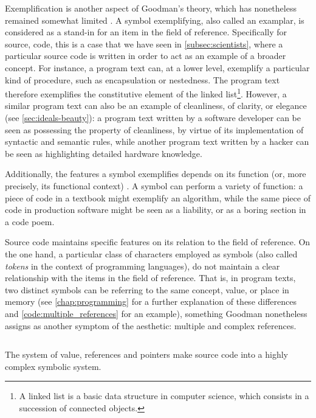 Exemplification is another aspect of Goodman's theory, which has nonetheless remained somewhat limited \citep{elgin_making_2011}. A symbol exemplifying, also called an examplar, is considered as a stand-in for an item in the field of reference. Specifically for source, code, this is a case that we have seen in \ref{subsec:scientists}, where a particular source code is written in order to act as an example of a broader concept. For instance, a program text can, at a lower level, exemplify a particular kind of procedure, such as encapsulation or nestedness. The program text therefore exemplifies the constitutive element of the linked list\footnote{A linked list is a basic data structure in computer science, which consists in a succession of connected objects.}. However, a similar program text can also be an example of cleanliness, of clarity, or elegance (see \ref{sec:ideals-beauty}): a program text written by a software developer can be seen as possessing the property of cleanliness, by virtue of its implementation of syntactic and semantic rules, while another program text written by a hacker can be seen as highlighting detailed hardware knowledge.

Additionally, the features a symbol exemplifies depends on its function (or, more precisely, its functional context) \citep{elgin_understanding_1993}. A symbol can perform a variety of function: a piece of code in a textbook might exemplify an algorithm, while the same piece of code in production software might be seen as a liability, or as a boring section in a code poem.

Source code maintains specific features on its relation to the field of reference. On the one hand, a particular class of characters employed as symbols (also called \emph{tokens} in the context of programming languages), do not maintain a clear relationship with the items in the field of reference. That is, in program texts, two distinct symbols can be referring to the same concept, value, or place in memory (see \ref{chap:programming} for a further explanation of these differences and \ref{code:multiple_references} for an example), something Goodman nonetheless assigns as another symptom of the aesthetic: multiple and complex references.

\begin{listing}
    \inputminted{rust}{./corpus/multiple_references.rs}
    \caption{The system of value, references and pointers make source code into a highly complex symbolic system.}
    \label{code:multiple_references}
\end{listing}


